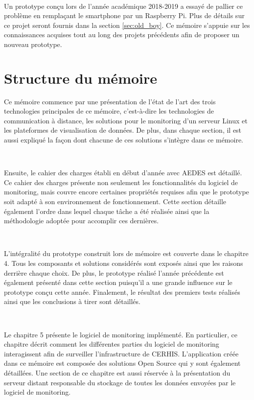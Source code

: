 ~

\noindent
Un prototype conçu lors de l'année académique 2018-2019 a essayé de pallier ce problème en remplaçant le smartphone par un Raspberry Pi. Plus de détails sur ce projet seront fournis dans la section \ref{sec:old_boy}. Ce mémoire s'appuie sur les connaissances acquises tout au long des projets précédents afin de proposer un nouveau prototype.


\section{Structure du mémoire}

\noindent
Ce mémoire commence par une présentation de l'état de l'art des trois technologies principales de ce mémoire, c'est-à-dire les technologies de communication à distance, les solutions pour le monitoring d'un serveur Linux et les plateformes de visualisation de données. De plus, dans chaque section, il est aussi expliqué la façon dont chacune de ces solutions s'intègre dans ce mémoire.

~

\noindent
Ensuite, le cahier des charges établi en début d'année avec AEDES est détaillé. Ce cahier des charges présente non seulement les fonctionnalités du logiciel de monitoring, mais couvre encore certaines propriétés requises afin que le prototype soit adapté à son environnement de fonctionnement. Cette section détaille également l'ordre dans lequel chaque tâche a été réalisée ainsi que la méthodologie adoptée pour accomplir ces dernières.

~

\noindent
L'intégralité du prototype construit lors de mémoire est couverte dans le chapitre 4. Tous les composants et solutions considérés sont exposés ainsi que les raisons derrière chaque choix.  De plus, le prototype réalisé l'année précédente est également présenté dans cette section puisqu'il a une grande influence sur le prototype conçu cette année. Finalement, le résultat des premiers tests réalisés ainsi que les conclusions à tirer sont détaillés.

~

\noindent
Le chapitre 5 présente le logiciel de monitoring implémenté. En particulier, ce chapitre décrit comment les différentes parties du logiciel de monitoring interagissent afin de surveiller l'infrastructure de CERHIS. L'application créée dans ce mémoire est composée des solutions Open Source qui y sont également détaillées. Une section de ce chapitre est aussi réservée à la présentation du serveur distant responsable du stockage de toutes les données envoyées par le logiciel de monitoring.

